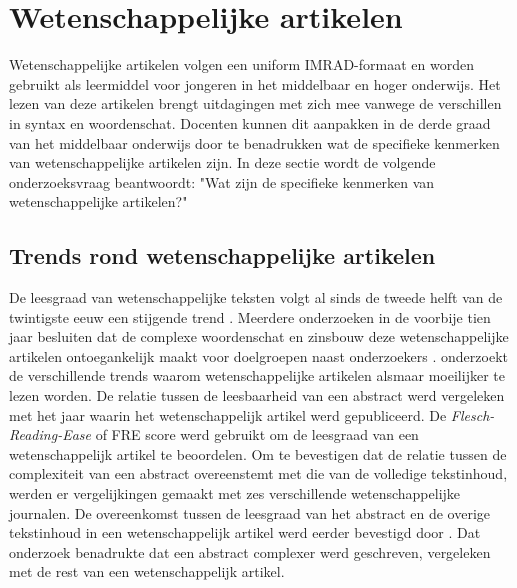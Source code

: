 \section{Wetenschappelijke artikelen}
Wetenschappelijke artikelen volgen een uniform IMRAD-formaat en worden gebruikt als leermiddel voor jongeren in het middelbaar en hoger onderwijs. Het lezen van deze artikelen brengt uitdagingen met zich mee vanwege de verschillen in syntax en woordenschat. Docenten kunnen dit aanpakken in de derde graad van het middelbaar onderwijs door te benadrukken wat de specifieke kenmerken van wetenschappelijke artikelen zijn. In deze sectie wordt de volgende onderzoeksvraag beantwoordt: "Wat zijn de specifieke kenmerken van wetenschappelijke artikelen?"

\subsection{Trends rond wetenschappelijke artikelen}
De leesgraad van wetenschappelijke teksten volgt al sinds de tweede helft van de twintigste eeuw een stijgende trend \autocite{Hayes1992}. Meerdere onderzoeken in de voorbije tien jaar besluiten dat de complexe woordenschat en zinsbouw deze wetenschappelijke artikelen ontoegankelijk maakt voor doelgroepen naast onderzoekers \autocite{Ball2017, PlavenSigray2017, Jones2019}. \textcite{PlavenSigray2017} onderzoekt de verschillende trends waarom wetenschappelijke artikelen alsmaar moeilijker te lezen worden. De relatie tussen de leesbaarheid van een abstract werd vergeleken met het jaar waarin het wetenschappelijk artikel werd gepubliceerd. De \textit{Flesch-Reading-Ease} of FRE score werd gebruikt om de leesgraad van een wetenschappelijk artikel te beoordelen. Om te bevestigen dat de relatie tussen de complexiteit van een abstract overeenstemt met die van de volledige tekstinhoud, werden er vergelijkingen gemaakt met zes verschillende wetenschappelijke journalen. De overeenkomst tussen de leesgraad van het abstract en de overige tekstinhoud in een wetenschappelijk artikel werd eerder bevestigd door \textcite{Dronberger1975}. Dat onderzoek benadrukte dat een abstract complexer werd geschreven, vergeleken met de rest van een wetenschappelijk artikel.

